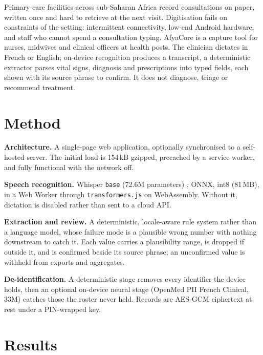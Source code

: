 Primary-care facilities across sub-Saharan Africa record consultations on
paper, written once and hard to retrieve at the next visit. Digitisation fails
on constraints of the setting: intermittent connectivity, low-end Android
hardware, and staff who cannot spend a consultation typing. AfyaCore is a capture tool for nurses, midwives and clinical officers at health
posts. The clinician dictates in French or English; on-device recognition
produces a transcript, a deterministic extractor parses vital signs, diagnosis
and prescriptions into typed fields, each shown with its source phrase to
confirm. It does not diagnose, triage or recommend treatment.

\section{Method}

\textbf{Architecture.} A single-page web application, optionally synchronised
to a self-hosted server. The initial load is 154\,kB gzipped, precached by a
service worker, and fully functional with the network off.

\textbf{Speech recognition.} Whisper \texttt{base} (72.6M parameters)
\citep{radford2022whisper}, ONNX, int8 (81\,MB), in a Web Worker through
\texttt{transformers.js} on WebAssembly. Without it, dictation is disabled
rather than sent to a cloud API.

\textbf{Extraction and review.} A deterministic, locale-aware rule system
rather than a language model, whose failure mode is a plausible wrong number
with nothing downstream to catch it. Each value carries a plausibility range,
is dropped if outside it, and is confirmed beside its source phrase; an
unconfirmed value is withheld from exports and aggregates.

\textbf{De-identification.} A deterministic stage removes every identifier the
device holds, then an optional on-device neural stage (OpenMed PII French
Clinical, 33M) \citep{openmed2025} catches those the roster never held. Records are
AES-GCM ciphertext at rest under a PIN-wrapped key.

\section{Results}

